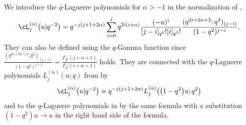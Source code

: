 We introduce the $q$-Laguerre polynomials for $\alpha>-1$ in the normalization of \cite[p.~24]{MR2595267},
\begin{gather}
\label{qLaginv}
\cL^{(\alpha)}_j\big(u|q^{-2}\big) = q^{-j(j+1+2\alpha)}\sum_{i=0}^jq^{2i(i+\alpha)}\frac{(-u)^i}{[j-i]_{q^2}![i]_{q^2}!}\frac{(q^{2i+2\alpha+2};q^2)_{(j-i)}}{(1-q^2)^{j-i}}.
\end{gather}
They can also be def\/ined using the $q$-Gamma function since $\frac{(q^{2i+2\alpha+2};q^2)_{(j-i)}}{(1-q^2)^{j-i}}=\frac{\Gamma_{q^2}(j+\alpha+1)}{\Gamma_{q^2}(i+\alpha+1)}$ holds. They are connected with the $q$-Laguerre polynomials $L_j^{(\alpha)}(u;q)$ from \cite[Section~3.21]{Koekoek}  by
\begin{gather*}
\cL_j^{(\alpha)}\big(u|q^{-2}\big) = q^{-j(j+1+2\alpha)}L_j^{(\alpha)}\big(\big(1-q^2\big)u;q^2\big)
\end{gather*}
and to the $q$-Laguerre polynomials in \cite{MR0618759} by the same formula with a substitution  $(1-q^2)u\to u$ in the right hand side of the formula.

